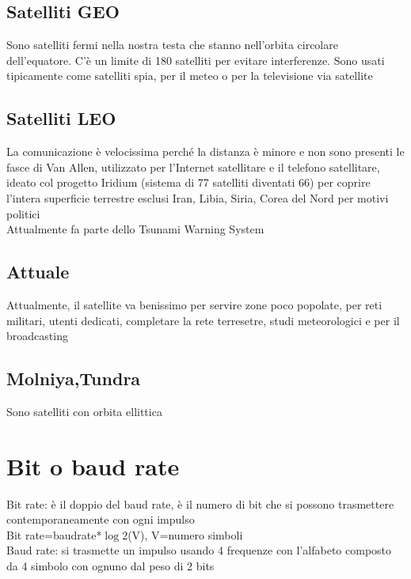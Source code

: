 \documentclass[12pt,oneside,a4paper]{article}
\begin{document}
\subsection{Satelliti GEO}
Sono satelliti fermi nella nostra testa che stanno nell'orbita circolare dell'equatore. C'è un limite di 180 satelliti per evitare interferenze. Sono usati tipicamente come satelliti spia, per il meteo o per la televisione via satellite
\subsection{Satelliti LEO}
La comunicazione è velocissima perché la distanza è minore e non sono presenti le fasce di Van Allen, utilizzato per l'Internet satellitare e il telefono satellitare, ideato col progetto Iridium (sistema di 77 satelliti diventati 66) per coprire l'intera superficie terrestre esclusi Iran, Libia, Siria, Corea del Nord per motivi politici\\
Attualmente fa parte dello Tsunami Warning System\\
\subsection{Attuale}
Attualmente, il satellite va benissimo per servire zone poco popolate, per reti militari, utenti dedicati, completare la rete terresetre, studi meteorologici e per il broadcasting
\subsection{Molniya,Tundra}
Sono satelliti con orbita ellittica
\section{Bit o baud rate}
Bit rate: è il doppio del baud rate, è il numero di bit che si possono trasmettere contemporaneamente con ogni impulso\\
Bit rate=baudrate*$\log{2}$(V), V=numero simboli\\
Baud rate: si trasmette un impulso usando 4 frequenze con l'alfabeto composto da 4 simbolo con ognuno dal peso di 2 bits
\end{document}
